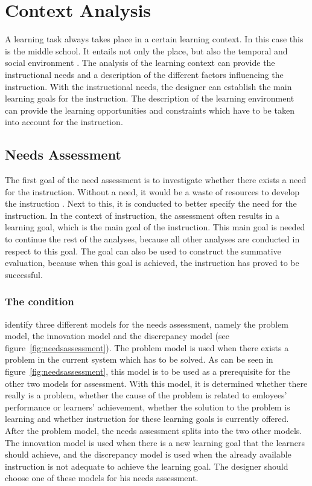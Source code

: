 \documentclass[12pt]{report} %
\begin{document}
\chapter{Context Analysis}

A learning task always takes place in a certain learning context. In this case this is the middle school. It entails not only the place, but also the temporal and social environment \cite{smithragan}. The analysis of the learning context can provide the instructional needs and a description of the different factors influencing the instruction. With the instructional needs, the designer can establish the main learning goals for the instruction. The description of the learning environment can provide the learning opportunities and constraints which have to be taken into account for the instruction.


\section{Needs Assessment}

The first goal of the need assessment is to investigate whether there exists a need for the instruction.  Without a need, it would be a waste of resources to develop the instruction \cite{smithragan}. Next to this, it is conducted to better specify the need for the instruction. In the context of instruction, the assessment often results in a learning goal, which is the main goal of the instruction. This main goal is needed to continue the rest of the analyses, because all other analyses are conducted in respect to this goal. The goal can also be used to construct the summative evaluation, because when this goal is achieved, the instruction has proved to be successful.

\subsection{The condition}

 identify three different models for the needs assessment, namely the problem model, the innovation model and the discrepancy model (see figure~\ref{fig:needsassessment}). The problem model is used when there exists a problem in the current system which has to be solved. As can be seen in figure~\ref{fig:needsassessment}, this model is to be used as a prerequisite for the other two models for assessment. With this model, it is determined whether there really is a problem, whether the cause of the problem is related to emloyees' performance or learners' achievement, whether the solution to the problem is learning and whether instruction for these learning goals is currently offered. After the problem model, the needs assessment splits into the two other models. The innovation model is used when there is a new learning goal that the learners should achieve, and the discrepancy model is used when the already available instruction is not adequate to achieve the learning goal. The designer should choose one of these models for his needs assessment.
\end{document}
